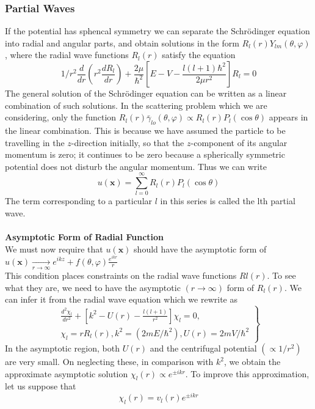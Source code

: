 \subsubsection{Partial Waves}
If the potential has sphencal symmetry we can separate the Schrödinger equation into radial and angular parts, and obtain solutions in the form $R_{l}(r) Y_{l m}{(\theta, \varphi)}$, where the radial wave functions $R_{l}(r)$ satisfy the equation
$$
1/r^2 \frac{d}{dr}\left(r^{2} \frac{d R_l}{d r}\right)+\frac{2 \mu}{\hbar^{2}}\left[E-V-\frac{l(l+1) \hbar^{2}}{2 \mu r^{2}}\right] R_l=0
$$
The general solution of the Schrödinger equation can be written as a linear combination of such solutions. In the scattering problem which we are considering, only the function $R_{l}(r) \bar{\gamma}_{l o}(\theta, \varphi) \propto R_{l}(r) P_{l}(\cos \theta)$ appears in the linear combination. This is because we have assumed the particle to be travelling in the $z$-direction initially, so that the $z$-component of its angular momentum is zero; it continues to be zero because a spherically symmetric potential does not disturb the angular momentum. Thus we can write
$$
u(\mathbf{x})=\sum_{l=0}^{\infty} R_{l}(r) P_{l}(\cos \theta)
$$
The term corresponding to a particular $l$ in this series is called the lth partial wave.\\\\
\textbf{Asymptotic Form of Radial Function}\\
 We must now require that $u(\mathbf{x})$ should have the asymptotic form of$u(\mathbf{x}) \underset{r \rightarrow \infty}{\longrightarrow} e^{i k z}+f(\theta, \varphi) \frac{e^{i k r}}{r}$ \\
  This condition places constraints on the radial wave functions $R l(r)$. To see what they are, we need to have the asymptotic $(r \rightarrow \infty)$ form of $R_{l}(r)$. We can infer it from the radial wave equation  which we rewrite as
$$
\left.\begin{array}{l}
\frac{d^{2} \chi_{l}}{d r^{2}}+\left[k^{2}-U(r)-\frac{l(l+1)}{r^{2}}\right] \chi_{l}=0, \\
\chi_{l}=r R_{l}(r), k^{2}=\left(2 m E / \hbar^{2}\right), U(r)=2 m V / \hbar^{2}
\end{array}\right\}
$$
In the asymptotic region, both $U(r)$ and the centrifugal potential $\left(\propto 1 / r^{2}\right)$ are very small. On neglecting these, in comparison with $k^{2}$, we obtain the approximate asymptotic solution $\chi_{l}(r) \propto e^{\pm i k r}$. To improve this approximation, let us suppose that
$$\chi_{l}(r)=v_{l}(r) e^{\pm i k r}$$
